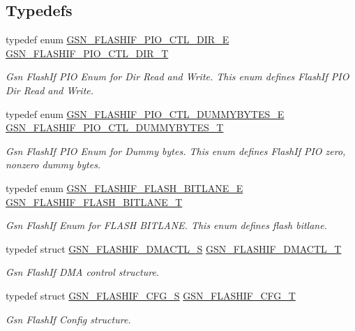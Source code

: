 \subsection*{Typedefs}
\begin{DoxyCompactItemize}
\item 
typedef enum \hyperlink{a00647_gaaf02993c8f105b4a90a6b27ef19dae0f}{GSN\_\-FLASHIF\_\-PIO\_\-CTL\_\-DIR\_\-E} \hyperlink{a00647_gad02bc7e7274fd3ba828e7ed35c282eaf}{GSN\_\-FLASHIF\_\-PIO\_\-CTL\_\-DIR\_\-T}
\begin{DoxyCompactList}\small\item\em Gsn FlashIf PIO Enum for Dir Read and Write. This enum defines FlashIf PIO Dir Read and Write. \end{DoxyCompactList}\item 
typedef enum \hyperlink{a00647_ga21630134ac87b1ff38712e4f4c0b4a4e}{GSN\_\-FLASHIF\_\-PIO\_\-CTL\_\-DUMMYBYTES\_\-E} \hyperlink{a00647_gad29e842797fae82ccad1e80f4fc97a1c}{GSN\_\-FLASHIF\_\-PIO\_\-CTL\_\-DUMMYBYTES\_\-T}
\begin{DoxyCompactList}\small\item\em Gsn FlashIf PIO Enum for Dummy bytes. This enum defines FlashIf PIO zero, nonzero dummy bytes. \end{DoxyCompactList}\item 
typedef enum \hyperlink{a00647_gad00f759b28a1db7a281e681f949cd164}{GSN\_\-FLASHIF\_\-FLASH\_\-BITLANE\_\-E} \hyperlink{a00647_gaf1a2041a13f5df83afd39cc00dd1f5c0}{GSN\_\-FLASHIF\_\-FLASH\_\-BITLANE\_\-T}
\begin{DoxyCompactList}\small\item\em Gsn FlashIf Enum for FLASH BITLANE. This enum defines flash bitlane. \end{DoxyCompactList}\item 
typedef struct \hyperlink{a00080}{GSN\_\-FLASHIF\_\-DMACTL\_\-S} \hyperlink{a00647_ga3191e2eabef0c8e1b95922431d75565f}{GSN\_\-FLASHIF\_\-DMACTL\_\-T}
\begin{DoxyCompactList}\small\item\em Gsn FlashIf DMA control structure. \end{DoxyCompactList}\item 
typedef struct \hyperlink{a00078}{GSN\_\-FLASHIF\_\-CFG\_\-S} \hyperlink{a00647_gaaf4a476f19c5d44c391a5e5dab872e9b}{GSN\_\-FLASHIF\_\-CFG\_\-T}
\begin{DoxyCompactList}\small\item\em Gsn FlashIf Config structure. \end{DoxyCompactList}\item 

\end{DoxyCompactItemize}
